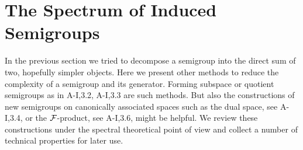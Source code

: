 \section{The Spectrum of Induced Semigroups}\label{sec:a3-4}
In the previous section we tried to decompose a semigroup into the direct sum of two, hopefully simpler objects.
Here we present other methods to reduce the complexity of a semigroup and its generator.
Forming subspace or quotient semigroups as in A-I,3.2, A-I,3.3 are such methods.
But also the constructions of new semigroups on canonically associated spaces such as the dual space, see A-I,3.4, or the $\mathcal{F}$-product, see A-I,3.6, might be helpful.
We review these constructions under the spectral theoretical point of view and collect a number of technical properties for later use.

